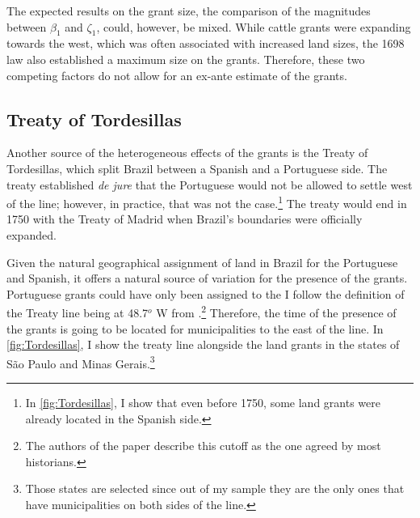 \documentclass[11pt]{article}
\begin{document}
The expected results on the grant size, the comparison of the magnitudes between $\beta_1$ and $\zeta_1$, could, however, be mixed. 
While cattle grants were expanding towards the west, which was often associated with increased land sizes, the 1698 law also established a maximum size on the grants. 
Therefore, these two competing factors do not allow for an ex-ante estimate of the grants.





\subsection{Treaty of Tordesillas}
\label{sec:tordesillas} 

Another source of the heterogeneous effects of the grants is the Treaty of Tordesillas, which split Brazil between a Spanish and a Portuguese side. 
The treaty established \textit{de jure} that the Portuguese would not be allowed to settle west of the line; however, in practice, that was not the case.\footnote{In \autoref{fig:Tordesillas}, I show that even before 1750, some land grants were already located in the Spanish side.}
The treaty would end in 1750 with the Treaty of Madrid when Brazil's boundaries were officially expanded.

Given the natural geographical assignment of land in Brazil for the Portuguese and Spanish, it offers a natural source of variation for the presence of the grants.
Portuguese grants could have only been assigned to the 
I follow the definition of the Treaty line being at 48.7$^o$ W from  \textcite{Laudares2023-wl}.\footnote{The authors of the paper describe this cutoff as the one agreed by most historians.}
Therefore, the time of the presence of the grants is going to be located for municipalities to the east of the line.
In \autoref{fig:Tordesillas}, I show the treaty line alongside the land grants in the states of São Paulo and Minas Gerais.\footnote{Those states are selected since out of my sample they are the only ones that have municipalities on both sides of the line.}
\end{document}
